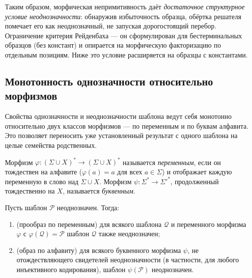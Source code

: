\documentclass[14pt, russian]{scrartcl}
\begin{document}
Таким образом, морфическая непримитивность даёт \textit{достаточное структурное условие
неоднозначности}: обнаружив избыточность образца, обёртка решателя помечает его как
неоднозначный, не запуская дорогостоящий перебор. Ограничение критерия Рейденбаха ---
он сформулирован для бестерминальных образцов (без констант) и опирается на
морфическую факторизацию по отдельным позициям. Ниже это условие расширяется на
образцы с константами.

\subsection{Монотонность однозначности относительно морфизмов}
\label{sec:morphmono}

Свойства однозначности и неоднозначности шаблона ведут себя монотонно относительно
двух классов морфизмов --- по переменным и по буквам алфавита. Это позволяет
переносить уже установленный результат с одного шаблона на целые семейства родственных.

\begin{Definition}
Морфизм $\varphi : (\Sigma \cup X)^* \to (\Sigma \cup X)^*$ называется
\textit{переменным}, если он тождествен на алфавите ($\varphi(a) = a$ для всех
$a \in \Sigma$) и отображает каждую переменную в слово над $\Sigma \cup X$.
Морфизм $\psi : \Sigma^* \to \Sigma'^*$, продолженный тождественно на $X$,
называется \textit{буквенным}.
\end{Definition}

\begin{Lemma}
\label{lem:ambmono}
Пусть шаблон $\mathcal{P}$ неоднозначен. Тогда:
\begin{enumerate}
\item (прообраз по переменным) для всякого шаблона $\mathcal{Q}$ и переменного
  морфизма $\varphi$ с $\varphi(\mathcal{Q}) = \mathcal{P}$ шаблон $\mathcal{Q}$
  также неоднозначен;
\item (образ по алфавиту) для всякого буквенного морфизма $\psi$, не отождествляющего
  свидетелей неоднозначности (в частности, для любого инъективного кодирования),
  шаблон $\psi(\mathcal{P})$ неоднозначен.
\end{enumerate}
\end{Lemma}
\end{document}
